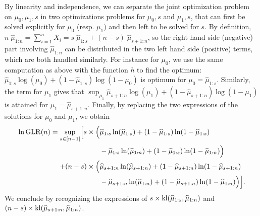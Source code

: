     By linearity and independence, we can separate the joint optimization problem on $\mu_0,\mu_1,s$ in two optimizations problems for $\mu_0,s$ and $\mu_1,s$, that can first be solved explicitly for $\mu_0$ (resp. $\mu_1$) and then left to be solved for $s$.
    By definition, $n \; \widehat{\mu}_{1:n} = \sum_{i=1}^n X_i = s \;\widehat{\mu}_{1:s} + (n-s) \;\widehat{\mu}_{s+1:n}$, so the right hand side (negative) part involving $\widehat{\mu}_{1:n}$ can be distributed in the two left hand side (positive) terms,
    which are both handled similarly.
    For instance for $\mu_0$, we use the same computation as above with the function $h$ to find the optimum:
    $\widehat{\mu}_{1:s} \log(\mu_0) + (1 - \widehat{\mu}_{1:s}) \log(1-\mu_0)$
    is optimum for $\mu_0 = \widehat{\mu}_{1:s}$.
    Similarly, the term for $\mu_1$ gives that $\sup_{\mu_1} \widehat{\mu}_{s+1:n} \log(\mu_1) + (1 - \widehat{\mu}_{s+1:n}) \log(1-\mu_1)$
    is attained for $\mu_1 = \widehat{\mu}_{s+1:n}$.
    Finally, by replacing the two expressions of the solutions for $\mu_0$ and $\mu_1$,
    we obtain
    \begin{align*}
        \ln \mathrm{GLR}(n)
        = \sup\limits_{s \in [n-1]} \Bigl[
            s \times \Bigl(
                    & \widehat{\mu}_{1:s} \ln(\widehat{\mu}_{1:s}) + (1 - \widehat{\mu}_{1:s}) \ln(1-\widehat{\mu}_{1:s}) \\
                    & - \widehat{\mu}_{1:s} \ln(\widehat{\mu}_{1:n}) + (1 - \widehat{\mu}_{1:s}) \ln(1-\widehat{\mu}_{1:n})
            \Bigr) \\
            + (n-s) \times \Bigl(
                & \widehat{\mu}_{s+1:n} \ln(\widehat{\mu}_{s+1:n}) + (1 - \widehat{\mu}_{s+1:n}) \ln(1-\widehat{\mu}_{s+1:n}) \\
                & - \widehat{\mu}_{s+1:n} \ln(\widehat{\mu}_{1:n}) + (1 - \widehat{\mu}_{s+1:n}) \ln(1-\widehat{\mu}_{1:n})
            \Bigr)
        \Bigr].
    \end{align*}
    We conclude by recognizing the expressions of $s \times \mathrm{kl}(\widehat{\mu}_{1:s}, \widehat{\mu}_{1:n})$
    and $(n-s) \times \mathrm{kl}(\widehat{\mu}_{s+1:n}, \widehat{\mu}_{1:n})$.



